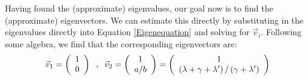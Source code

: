 Having found the (approximate) eigenvalues, our goal now is to find the (approximate) eigenvectors. We can estimate this directly by substituting in the eigenvalues directly into Equation \ref{Eigenequation} and solving for $\vec{v}_i$. Following some algebra, we find that the corresponding eigenvectors are:
\begin{align*}
    \vec{v}_1= \left( \begin{array}{c}
        1  \\
        0
    \end{array} \right)
    \hspace{2mm},\hspace{2mm}
    \vec{v}_2= \left( \begin{array}{c}
        1  \\
        a/b
    \end{array} \right)
    = \left( \begin{array}{c}
        1  \\
        \left( \lambda+\gamma+\lambda' \right)/\left(\gamma+\lambda' \right)
    \end{array} \right)
\end{align*}

